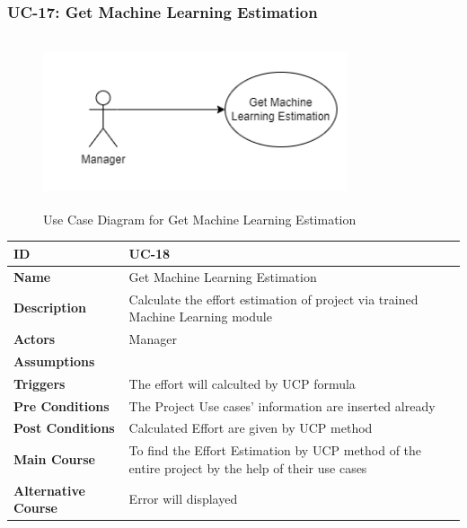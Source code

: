     \newpage

    \subsubsection{UC-17: Get Machine Learning Estimation}
    \begin{figure}[H]
        \includegraphics[height=5cm, width=0.8\textwidth]{./diagrams/Use Case/u17.png}
        \centering 
        \caption{Use Case Diagram for Get Machine Learning Estimation}
        \label{fig:Usecase1}
        \end{figure}
        
    \begin{center}
        \begin{tabularx}{\textwidth}{|l|X|}
            \hline
            \textbf{ID} & UC-18 \\
            \hline
            \textbf{Name} & Get Machine Learning Estimation \\
            \hline
            \textbf{Description} & Calculate the effort estimation of project via trained Machine Learning module \\
            \hline
            \textbf{Actors} & Manager  \\
            \hline
            \textbf{Assumptions} &  \\
            \hline
            \textbf{Triggers} & The effort will calculted by UCP formula \\
            \hline
            \textbf{Pre Conditions} & The Project Use cases' information are inserted already \\
            \hline
            \textbf{Post Conditions} & Calculated Effort are given by UCP method  \\
            \hline
            \textbf{Main Course} & To find the Effort Estimation by UCP method of the entire project by the help of their use cases \\
            \hline
            \textbf{Alternative Course} & Error will displayed \\
            \hline
            
        \end{tabularx}
    \end{center}
    \newpage
    

